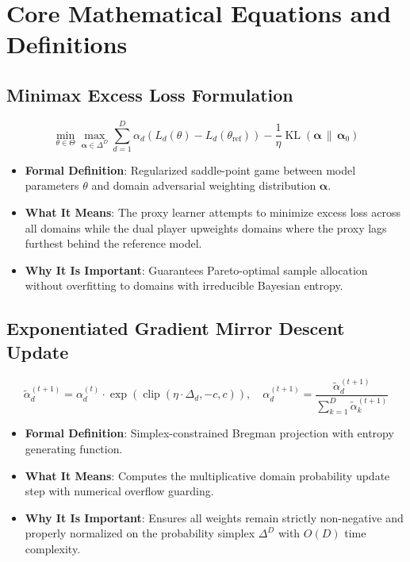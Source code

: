 \documentclass[11pt,a4paper]{article}
\theoremstyle{definition}
\begin{document}
\section{Core Mathematical Equations and Definitions}

\subsection{Minimax Excess Loss Formulation}
{\boldmath
\begin{equation}
\min_{\theta \in \Theta} \max_{\boldsymbol{\alpha} \in \Delta^D} \sum_{d=1}^D \alpha_d \left( L_d(\theta) - L_d(\theta_{\text{ref}}) \right) - \frac{1}{\eta} \operatorname{KL}\left(\boldsymbol{\alpha} \,\|\, \boldsymbol{\alpha}_0\right)
\end{equation}
}
\begin{itemize}
    \item \textbf{Formal Definition}: Regularized saddle-point game between model parameters $\theta$ and domain adversarial weighting distribution $\boldsymbol{\alpha}$.
    \item \textbf{What It Means}: The proxy learner attempts to minimize excess loss across all domains while the dual player upweights domains where the proxy lags furthest behind the reference model.
    \item \textbf{Why It Is Important}: Guarantees Pareto-optimal sample allocation without overfitting to domains with irreducible Bayesian entropy.
\end{itemize}

\subsection{Exponentiated Gradient Mirror Descent Update}
{\boldmath
\begin{equation}
\tilde{\alpha}_d^{(t+1)} = \alpha_d^{(t)} \cdot \exp\left( \operatorname{clip}\left(\eta \cdot \Delta_d, -c, c\right) \right), \quad \alpha_d^{(t+1)} = \frac{\tilde{\alpha}_d^{(t+1)}}{\sum_{k=1}^D \tilde{\alpha}_k^{(t+1)}}
\end{equation}
}
\begin{itemize}
    \item \textbf{Formal Definition}: Simplex-constrained Bregman projection with entropy generating function.
    \item \textbf{What It Means}: Computes the multiplicative domain probability update step with numerical overflow guarding.
    \item \textbf{Why It Is Important}: Ensures all weights remain strictly non-negative and properly normalized on the probability simplex $\Delta^D$ with $O(D)$ time complexity.
\end{itemize}
\end{document}
